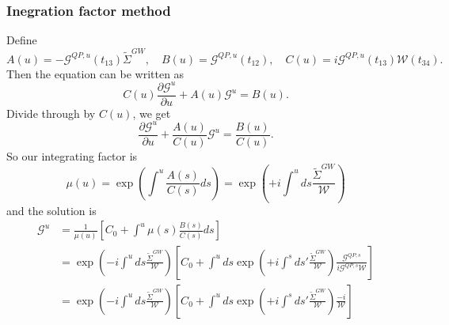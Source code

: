 \begin{tcolorbox}
\subsubsection{Inegration factor method}
Define $A(u)=-\mathcal{G}^{Q P, u}\left(t_{13}\right) \tilde{\Sigma}^{G W}, \quad B(u)=\mathcal{G}^{Q P, u}\left(t_{12}\right), \quad C(u)=i \mathcal{G}^{Q P, u}\left(t_{13}\right) \mathcal{W}\left(t_{34}\right) .$ Then the equation can be written as
\begin{equation}
C(u) \frac{\partial \mathcal{G}^u}{\partial u}+A(u) \mathcal{G}^u=B(u) .
\end{equation}
Divide through by $C(u)$, we get
\begin{equation}
\frac{\partial \mathcal{G}^u}{\partial u}+\frac{A(u)}{C(u)} \mathcal{G}^u=\frac{B(u)}{C(u)} .
\end{equation}
So our integrating factor is
\begin{equation}
\mu(u)=\exp \left(\int^u \frac{A(s)}{C(s)} d s\right) = \exp \left(+i \int^u d s \frac{\tilde{\Sigma}^{G W}}{\mathcal{W}}\right)
\end{equation}
and the solution is
\begin{align}
\mathcal{G}^u&=\frac{1}{\mu(u)}\left[C_0+\int^u \mu(s) \frac{B(s)}{C(s)} d s\right]\\
& = \exp \left(-i \int^u d s \frac{\tilde{\Sigma}^{G W}}{\mathcal{W}}\right)\left[C_0+\int^u d s \exp \left(+i \int^s d s' \frac{\tilde{\Sigma}^{G W}}{\mathcal{W}}\right) \frac{\mathcal{G}^{Q P, s}}{i \mathcal{G}^{Q P, s} \mathcal{W}}\right] \\
& = \exp \left(-i \int^u d s \frac{\tilde{\Sigma}^{G W}}{\mathcal{W}}\right)\left[C_0+\int^u d s \exp \left(+i\int^s d s' \frac{\tilde{\Sigma}^{G W}}{\mathcal{W}}\right) \frac{-i}{ \mathcal{W}}\right] \\
\end{align}    
\end{tcolorbox}





